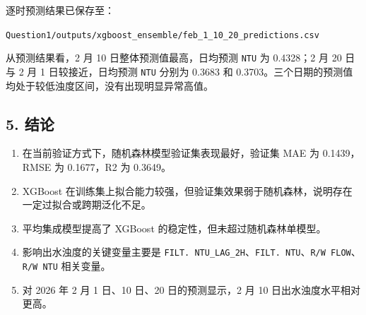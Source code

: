\documentclass[
]{ctexart}
\providecommand{\tightlist}{%
  \setlength{\itemsep}{0pt}\setlength{\parskip}{0pt}}
\begin{document}
逐时预测结果已保存至：

\texttt{Question1/outputs/xgboost\_ensemble/feb\_1\_10\_20\_predictions.csv}

从预测结果看，2 月 10 日整体预测值最高，日均预测 \texttt{NTU} 为
0.4328；2 月 20 日与 2 月 1 日较接近，日均预测 \texttt{NTU} 分别为
0.3683 和
0.3703。三个日期的预测值均处于较低浊度区间，没有出现明显异常高值。

\hypertarget{ux7ed3ux8bba}{%
\subsection{5. 结论}\label{ux7ed3ux8bba}}

\begin{enumerate}
\def\labelenumi{\arabic{enumi}.}
\tightlist
\item
  在当前验证方式下，随机森林模型验证集表现最好，验证集 MAE 为
  0.1439，RMSE 为 0.1677，R2 为 0.3649。
\item
  XGBoost
  在训练集上拟合能力较强，但验证集效果弱于随机森林，说明存在一定过拟合或跨期泛化不足。
\item
  平均集成模型提高了 XGBoost 的稳定性，但未超过随机森林单模型。
\item
  影响出水浊度的关键变量主要是
  \texttt{FILT.\ NTU\_LAG\_2H}、\texttt{FILT.\ NTU}、\texttt{R/W\ FLOW}、\texttt{R/W\ NTU}
  相关变量。
\item
  对 2026 年 2 月 1 日、10 日、20 日的预测显示，2 月 10
  日出水浊度水平相对更高。
\end{enumerate}
\end{document}
